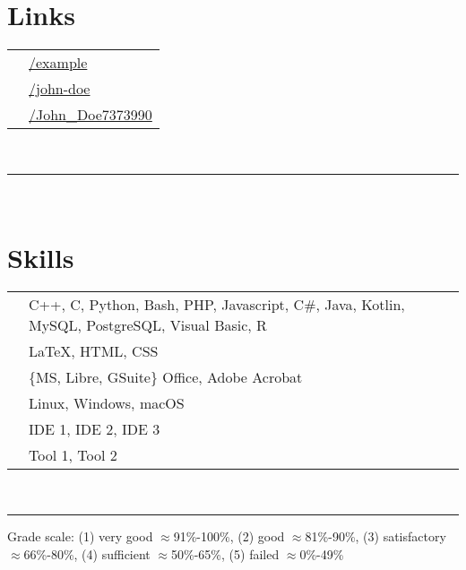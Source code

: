 \documentclass[oneside]{article}
\begin{document}
{\begin{minipage}[t][\textheight-2\fboxsep-2\fboxrule][t]{\dimexpr0.40\textwidth-2\fboxrule-2\fboxsep\relax}
        \section*{\large Links}
        \begin{tabular}{cl}
            \faGithub{}   & \href{https://github.com/example}{/example} \\
            \faLinkedin{} & \href{https://www.linkedin.com/in/john-doe/}{/john-doe} \\
            \faXing{}     & \href{https://www.xing.com/profile/John_Doe7373990/cv}{/John\_Doe7373990} \\
        \end{tabular}
        \vspace{10pt} \\
        \rule{\linewidth}{0.4pt} \\
        \section*{\large Skills}
        \begin{tabularx}{\textwidth}{cY}
            \faCode{}        & C++, C, Python, Bash, PHP, Javascript, C\#, Java, Kotlin, MySQL, PostgreSQL, Visual Basic, R \\
            \faPen*{}        & \LaTeX, HTML, CSS \\
            \faFont{}        & \{MS, Libre, GSuite\} Office, Adobe Acrobat \\
            \faCogs{}        & Linux, Windows, macOS \\
            \faLaptopCode{}  & IDE 1, IDE 2, IDE 3 \\
            \faToolbox{}     & Tool 1, Tool 2 
        \end{tabularx}
        \vspace{1pt} \\
        \rule{\linewidth}{0.4pt}
        \vfill
        {\tiny Grade scale: (1) very good $\approx$91\%-100\%, (2) good $\approx$81\%-90\%, (3) satisfactory $\approx$66\%-80\%, (4) sufficient $\approx$50\%-65\%, (5) failed $\approx$0\%-49\%}
    \end{minipage}
}
\end{document}
